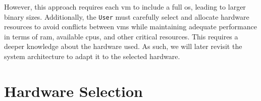 However, this approach requires each \gls{vm} to include a full \gls{os},
leading to larger binary sizes. Additionally, the \texttt{User} must carefully
select and allocate hardware resources to avoid conflicts between \glspl{vm}
while maintaining adequate performance in terms of \gls{ram}, available
\glspl{cpu}, and other critical resources. This requires a deeper knowledge
about the hardware used. As such, we will later revisit the system architecture
to adapt it to the selected hardware.

\section{Hardware Selection}
\label{sec:hardware-selection}




